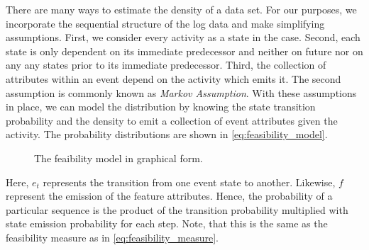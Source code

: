 \documentclass[./../../paper.tex]{subfiles}
\begin{document}
There are many ways to estimate the density of a data set. For our purposes, we incorporate the sequential structure of the log data and make simplifying assumptions. First, we consider every activity as a state in the case. Second, each state is only dependent on its immediate predecessor and neither on future nor on any any states prior to its immediate predecessor. Third, the collection of attributes within an event depend on the activity which emits it. The second assumption is commonly known as \emph{Markov Assumption}. With these assumptions in place, we can model the distribution by knowing the state transition probability and the density to emit a collection of event attributes given the activity. The probability distributions are shown in \autoref{eq:feasibility_model}.


\begin{figure}[htbp]
    \centering
    \caption{The feaibility model in graphical form.}
    \label{fig:markov_model}
\end{figure}


% 


\noindent Here, $e_t$ represents the transition from one event state to another. Likewise, $f$ represent the emission of the feature attributes.  Hence, the probability of a particular sequence is the product of the transition probability multiplied with state emission probability for each step. Note, that this is the same as the feasibility measure as in \autoref{eq:feasibility_measure}. 
\end{document}
